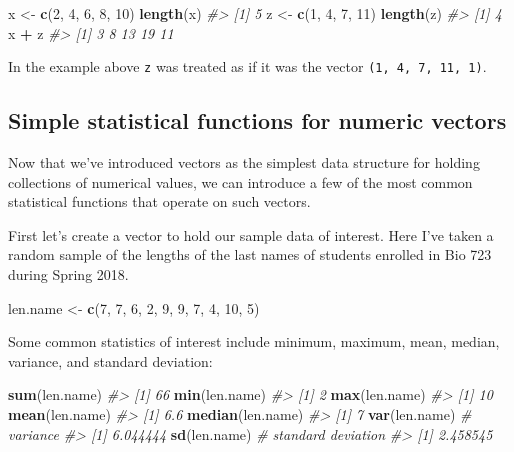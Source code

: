 \documentclass[]{book}
\newenvironment{Shaded}{\begin{snugshade}}{\end{snugshade}}
\newcommand{\CommentTok}[1]{\textcolor[rgb]{0.56,0.35,0.01}{\textit{#1}}}
\newcommand{\DecValTok}[1]{\textcolor[rgb]{0.00,0.00,0.81}{#1}}
\newcommand{\KeywordTok}[1]{\textcolor[rgb]{0.13,0.29,0.53}{\textbf{#1}}}
\newcommand{\NormalTok}[1]{#1}
\newcommand{\OperatorTok}[1]{\textcolor[rgb]{0.81,0.36,0.00}{\textbf{#1}}}
\newcommand{\StringTok}[1]{\textcolor[rgb]{0.31,0.60,0.02}{#1}}
\theoremstyle{definition}
\theoremstyle{definition}
\theoremstyle{definition}
\theoremstyle{remark}
\begin{document}
\begin{Shaded}
\begin{Highlighting}[]
\NormalTok{x <-}\StringTok{ }\KeywordTok{c}\NormalTok{(}\DecValTok{2}\NormalTok{, }\DecValTok{4}\NormalTok{, }\DecValTok{6}\NormalTok{, }\DecValTok{8}\NormalTok{, }\DecValTok{10}\NormalTok{)}
\KeywordTok{length}\NormalTok{(x)}
\CommentTok{#> [1] 5}
\NormalTok{z <-}\StringTok{ }\KeywordTok{c}\NormalTok{(}\DecValTok{1}\NormalTok{, }\DecValTok{4}\NormalTok{, }\DecValTok{7}\NormalTok{, }\DecValTok{11}\NormalTok{)}
\KeywordTok{length}\NormalTok{(z)}
\CommentTok{#> [1] 4}
\NormalTok{x }\OperatorTok{+}\StringTok{ }\NormalTok{z}
\CommentTok{#> [1]  3  8 13 19 11}
\end{Highlighting}
\end{Shaded}

In the example above \texttt{z} was treated as if it was the vector
\texttt{(1,\ 4,\ 7,\ 11,\ 1)}.

\hypertarget{simple-statistical-functions-for-numeric-vectors}{%
\subsection{Simple statistical functions for numeric
vectors}\label{simple-statistical-functions-for-numeric-vectors}}

Now that we've introduced vectors as the simplest data structure for
holding collections of numerical values, we can introduce a few of the
most common statistical functions that operate on such vectors.

First let's create a vector to hold our sample data of interest. Here
I've taken a random sample of the lengths of the last names of students
enrolled in Bio 723 during Spring 2018.

\begin{Shaded}
\begin{Highlighting}[]
\NormalTok{len.name <-}\StringTok{ }\KeywordTok{c}\NormalTok{(}\DecValTok{7}\NormalTok{, }\DecValTok{7}\NormalTok{, }\DecValTok{6}\NormalTok{, }\DecValTok{2}\NormalTok{, }\DecValTok{9}\NormalTok{, }\DecValTok{9}\NormalTok{, }\DecValTok{7}\NormalTok{, }\DecValTok{4}\NormalTok{, }\DecValTok{10}\NormalTok{, }\DecValTok{5}\NormalTok{)}
\end{Highlighting}
\end{Shaded}

Some common statistics of interest include minimum, maximum, mean,
median, variance, and standard deviation:

\begin{Shaded}
\begin{Highlighting}[]
\KeywordTok{sum}\NormalTok{(len.name)}
\CommentTok{#> [1] 66}
\KeywordTok{min}\NormalTok{(len.name)}
\CommentTok{#> [1] 2}
\KeywordTok{max}\NormalTok{(len.name)}
\CommentTok{#> [1] 10}
\KeywordTok{mean}\NormalTok{(len.name)}
\CommentTok{#> [1] 6.6}
\KeywordTok{median}\NormalTok{(len.name)}
\CommentTok{#> [1] 7}
\KeywordTok{var}\NormalTok{(len.name)  }\CommentTok{# variance}
\CommentTok{#> [1] 6.044444}
\KeywordTok{sd}\NormalTok{(len.name)   }\CommentTok{# standard deviation}
\CommentTok{#> [1] 2.458545}
\end{Highlighting}
\end{Shaded}
\end{document}
